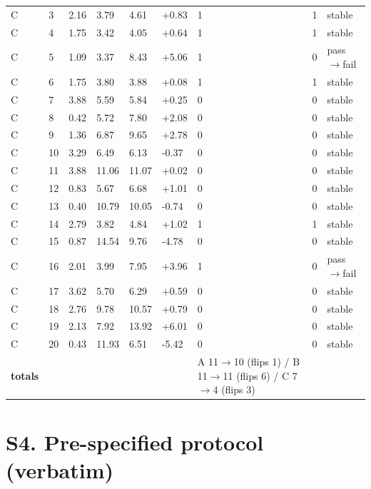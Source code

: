 \documentclass[11pt,a4paper]{article}
\begin{document}
\begin{landscape}
{\begin{longtable}[]{@{}lllllllll@{}}
C & 3 & 2.16 & 3.79 & 4.61 & +0.83 & 1 & 1 & stable \\
C & 4 & 1.75 & 3.42 & 4.05 & +0.64 & 1 & 1 & stable \\
C & 5 & 1.09 & 3.37 & 8.43 & +5.06 & 1 & 0 & pass\ensuremath{\rightarrow}fail \\
C & 6 & 1.75 & 3.80 & 3.88 & +0.08 & 1 & 1 & stable \\
C & 7 & 3.88 & 5.59 & 5.84 & +0.25 & 0 & 0 & stable \\
C & 8 & 0.42 & 5.72 & 7.80 & +2.08 & 0 & 0 & stable \\
C & 9 & 1.36 & 6.87 & 9.65 & +2.78 & 0 & 0 & stable \\
C & 10 & 3.29 & 6.49 & 6.13 & -0.37 & 0 & 0 & stable \\
C & 11 & 3.88 & 11.06 & 11.07 & +0.02 & 0 & 0 & stable \\
C & 12 & 0.83 & 5.67 & 6.68 & +1.01 & 0 & 0 & stable \\
C & 13 & 0.40 & 10.79 & 10.05 & -0.74 & 0 & 0 & stable \\
C & 14 & 2.79 & 3.82 & 4.84 & +1.02 & 1 & 1 & stable \\
C & 15 & 0.87 & 14.54 & 9.76 & -4.78 & 0 & 0 & stable \\
C & 16 & 2.01 & 3.99 & 7.95 & +3.96 & 1 & 0 & pass\ensuremath{\rightarrow}fail \\
C & 17 & 3.62 & 5.70 & 6.29 & +0.59 & 0 & 0 & stable \\
C & 18 & 2.76 & 9.78 & 10.57 & +0.79 & 0 & 0 & stable \\
C & 19 & 2.13 & 7.92 & 13.92 & +6.01 & 0 & 0 & stable \\
C & 20 & 0.43 & 11.93 & 6.51 & -5.42 & 0 & 0 & stable \\
\textbf{totals} & & & & & & A 11\ensuremath{\rightarrow}10 (flips 1) / B 11\ensuremath{\rightarrow}11 (flips 6) / C 7\ensuremath{\rightarrow}4 (flips 3) & & \\
\end{longtable}
}
\endgroup
\end{landscape}

\section*{S4. Pre-specified protocol (verbatim)}
\end{document}
